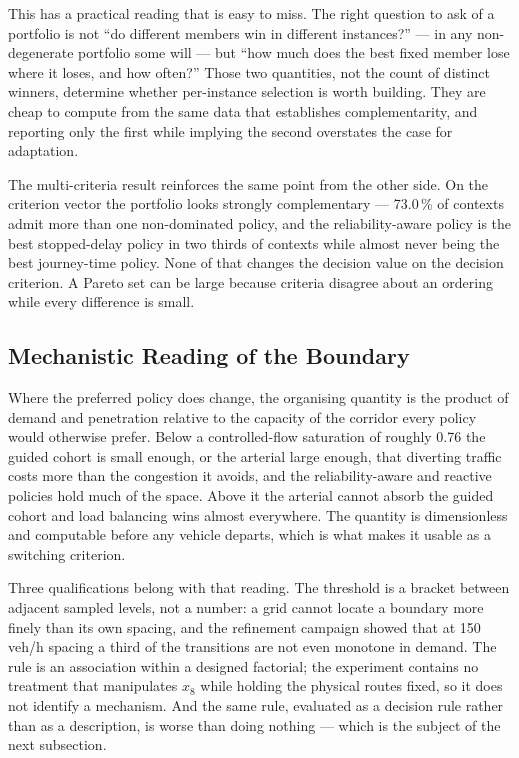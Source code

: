 This has a practical reading that is easy to miss. The right question to ask of a
portfolio is not ``do different members win in different instances?'' --- in any
non-degenerate portfolio some will --- but ``how much does the best fixed member
lose where it loses, and how often?'' Those two quantities, not the count of
distinct winners, determine whether per-instance selection is worth building.
They are cheap to compute from the same data that establishes complementarity,
and reporting only the first while implying the second overstates the case for
adaptation.

The multi-criteria result reinforces the same point from the other side. On the
criterion vector the portfolio looks strongly complementary --- 73.0\,\% of
contexts admit more than one non-dominated policy, and the reliability-aware
policy is the best stopped-delay policy in two thirds of contexts while almost
never being the best journey-time policy. None of that changes the decision value
on the decision criterion. A Pareto set can be large because criteria disagree
about an ordering while every difference is small.

\subsection{Mechanistic Reading of the Boundary}
\label{sec:disc:mech}

Where the preferred policy does change, the organising quantity is the product of
demand and penetration relative to the capacity of the corridor every policy would
otherwise prefer. Below a controlled-flow saturation of roughly 0.76 the guided
cohort is small enough, or the arterial large enough, that diverting traffic costs
more than the congestion it avoids, and the reliability-aware and reactive
policies hold much of the space. Above it the arterial cannot absorb the guided
cohort and load balancing wins almost everywhere. The quantity is dimensionless
and computable before any vehicle departs, which is what makes it usable as a
switching criterion.

Three qualifications belong with that reading. The threshold is a bracket between
adjacent sampled levels, not a number: a grid cannot locate a boundary more finely
than its own spacing, and the refinement campaign showed that at 150\,veh/h
spacing a third of the transitions are not even monotone in demand. The rule is an
association within a designed factorial; the experiment contains no treatment that
manipulates $x_8$ while holding the physical routes fixed, so it does not identify
a mechanism. And the same rule, evaluated as a decision rule rather than as a
description, is worse than doing nothing --- which is the subject of the next
subsection.

